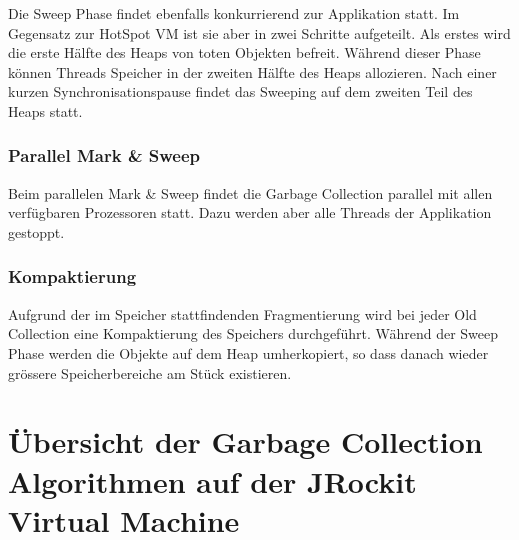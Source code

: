 Die Sweep Phase findet ebenfalls konkurrierend zur Applikation statt. Im Gegensatz zur HotSpot VM ist sie aber in zwei Schritte aufgeteilt. Als erstes wird die erste Hälfte des Heaps von toten Objekten befreit. Während dieser Phase können Threads Speicher in der zweiten Hälfte des Heaps allozieren. Nach einer kurzen Synchronisationspause findet das Sweeping auf dem zweiten Teil des Heaps statt.

\subsubsection{Parallel Mark \& Sweep}
Beim parallelen Mark \& Sweep findet die Garbage Collection parallel mit allen verfügbaren Prozessoren statt. Dazu werden aber alle Threads der Applikation gestoppt.

\subsubsection{Kompaktierung}
Aufgrund der im Speicher stattfindenden Fragmentierung wird bei jeder Old Collection eine Kompaktierung des Speichers durchgeführt. Während der Sweep Phase werden die Objekte auf dem Heap umherkopiert, so dass danach wieder grössere Speicherbereiche am Stück existieren.


\section{Übersicht der Garbage Collection Algorithmen auf der JRockit Virtual Machine}
